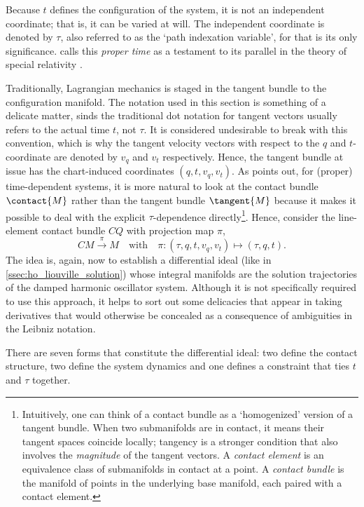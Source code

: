 Because $t$ defines the configuration of the system, it is not an independent coordinate; that is, it can be varied at will. The independent coordinate is denoted by $\tau$, also referred to as the `path indexation variable', for that is its only significance. \citet{Mendel2021} calls this \emph{proper time} as a testament to its parallel in the theory of special relativity \cite{Landau1971}.

Traditionally, Lagrangian mechanics is staged in the tangent bundle to the configuration manifold. The notation used in this section is something of a delicate matter, sinds the traditional dot notation for tangent vectors usually refers to the actual time $t$, not $\tau$. It is considered undesirable to break with this convention, which is why the tangent velocity vectors with respect to the $q$ and $t$-coordinate are denoted by $v_q$ and $v_t$ respectively. Hence, the tangent bundle at issue has the chart-induced coordinates $(q, t, v_q, v_t)$. As \citet{Burke1985} points out, for (proper) time-dependent systems, it is more natural to look at the contact bundle $\contact{M}$ rather than the tangent bundle $\tangent{M}$ because it makes it possible to deal with the explicit $\tau$-dependence directly\footnote{Intuitively, one can think of a contact bundle as a `homogenized' version of a tangent bundle. When two submanifolds are in contact, it means their tangent spaces coincide locally; tangency is a stronger condition that also involves the \emph{magnitude} of the tangent vectors. A \emph{contact element} is an equivalence class of submanifolds in contact at a point. A \emph{contact bundle} is the manifold of points in the underlying base manifold, each paired with a contact element.}. Hence, consider the line-element contact bundle $C\!Q$ with projection map $\pi$,
$$ C\!M \xrightarrow{\pi} M \quad\text{with}\quad \pi: (\tau, q, t, v_q, v_t) \mapsto (\tau, q, t). $$
The idea is, again, now to establish a differential ideal (like in \cref{ssec:ho_liouville_solution}) whose integral manifolds are the solution trajectories of the damped harmonic oscillator system. Although it is not specifically required to use this approach, it helps to sort out some delicacies that appear in taking derivatives that would otherwise be concealed as a consequence of ambiguities in the Leibniz notation.

There are seven forms that constitute the differential ideal: two define the contact structure, two define the system dynamics and one defines a constraint that ties $t$ and $\tau$ together.
